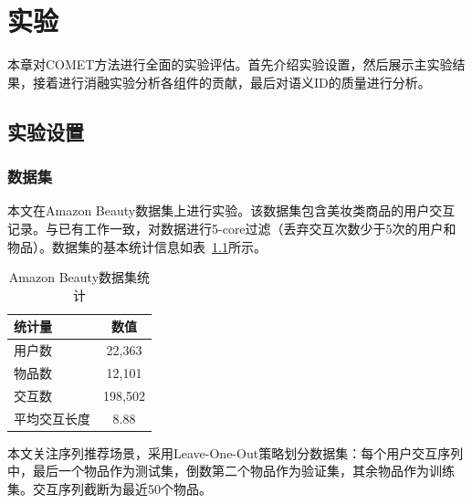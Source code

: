 
\chapter{实验}

本章对COMET方法进行全面的实验评估。首先介绍实验设置，然后展示主实验结果，接着进行消融实验分析各组件的贡献，最后对语义ID的质量进行分析。

\section{实验设置}

\subsection{数据集}

本文在Amazon Beauty数据集\cite{mcauley2015image}上进行实验。该数据集包含美妆类商品的用户交互记录。与已有工作\cite{rajput2023recommender,zheng2024adapting}一致，对数据进行5-core过滤（丢弃交互次数少于5次的用户和物品）。数据集的基本统计信息如表~\ref{tab:dataset}所示。

\begin{table}[htbp]
  \centering
  \caption{Amazon Beauty数据集统计}
  \label{tab:dataset}
  \begin{tabular}{lc}
    \toprule
    统计量 & 数值 \\
    \midrule
    用户数 & 22,363 \\
    物品数 & 12,101 \\
    交互数 & 198,502 \\
    平均交互长度 & 8.88 \\
    \bottomrule
  \end{tabular}
\end{table}

本文关注序列推荐场景，采用Leave-One-Out策略划分数据集：每个用户交互序列中，最后一个物品作为测试集，倒数第二个物品作为验证集，其余物品作为训练集。交互序列截断为最近50个物品。

